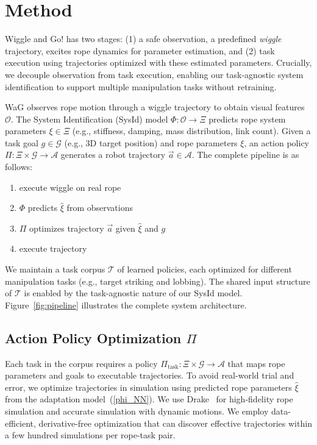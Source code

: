\documentclass[conference]{IEEEtran}
\newcommand{\waglong}{Wiggle and Go!}
\newcommand{\wag}{WaG}
\begin{document}
\section{Method}

\waglong{} has two stages: (1) a safe observation, a predefined \emph{wiggle} trajectory, excites rope dynamics for parameter estimation, and (2) task execution using trajectories optimized with these estimated parameters. Crucially, we decouple observation from task execution, enabling our task-agnostic system identification to support multiple manipulation tasks without retraining.

\wag{} observes rope motion through a wiggle trajectory to obtain visual features $\mathcal{O}$. The System Identification (SysId) model $\Phi: \mathcal{O} \rightarrow \Xi$ predicts rope system parameters $\xi \in \Xi$ (e.g., stiffness, damping, mass distribution, link count). Given a task goal $g \in \mathcal{G}$ (e.g., 3D target position) and rope parameters $\xi$, an action policy $\Pi: \Xi \times \mathcal{G} \rightarrow \mathcal{A}$ generates a robot trajectory $\vec{a} \in \mathcal{A}$. The complete pipeline is as follows: 
\begin{enumerate}
    \item execute wiggle on real rope
    \item $\Phi$ predicts $\hat{\xi}$ from observations
    \item $\Pi$ optimizes trajectory $\vec{a}$ given $\hat{\xi}$ and $g$
    \item execute trajectory
\end{enumerate}

We maintain a task corpus $\mathcal{T}$ of learned policies, each optimized for different manipulation tasks (e.g., target striking and lobbing). The shared input structure of $\mathcal{T}$ is enabled by the task-agnostic nature of our SysId model.
Figure~\ref{fig:pipeline} illustrates the complete system architecture.

\subsection{Action Policy Optimization $\Pi$} \label{sec:cmaes-traj}

Each task in the corpus requires a policy $\Pi_{\text{task}}: \Xi \times \mathcal{G} \rightarrow \mathcal{A}$ that maps rope parameters and goals to executable trajectories. 
To avoid real-world trial and error, we optimize trajectories in simulation using predicted rope parameters $\hat{\xi}$ from the adaptation model~(\ref{phi_NN}). 
We use Drake~\cite{drake} for high-fidelity rope simulation and accurate simulation with dynamic motions.
We employ data-efficient, derivative-free optimization that can discover effective trajectories within a few hundred simulations per rope-task pair.
\end{document}
